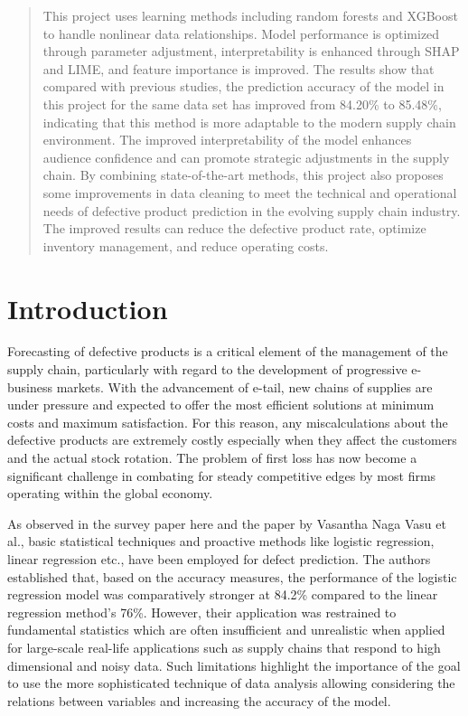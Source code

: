 \documentclass[conference]{IEEEtran}
\begin{document}
\maketitle

\begin{abstract}
This project uses learning methods including random forests and XGBoost to handle nonlinear data relationships. Model performance is optimized through parameter adjustment, interpretability is enhanced through SHAP and LIME, and feature importance is improved. The results show that compared with previous studies, the prediction accuracy of the model in this project for the same data set has improved from 84.20\% to 85.48\%, indicating that this method is more adaptable to the modern supply chain environment. The improved interpretability of the model enhances audience confidence and can promote strategic adjustments in the supply chain. By combining state-of-the-art methods, this project also proposes some improvements in data cleaning to meet the technical and operational needs of defective product prediction in the evolving supply chain industry. The improved results can reduce the defective product rate, optimize inventory management, and reduce operating costs.
\end{abstract}


\section{Introduction}

Forecasting of defective products is a critical element of the management of the supply chain, particularly with regard to the development of progressive e-business markets. With the advancement of e-tail, new chains of supplies are under pressure and expected to offer the most efficient solutions at minimum costs and maximum satisfaction. For this reason, any miscalculations about the defective products are extremely costly especially when they affect the customers and the actual stock rotation. The problem of first loss has now become a significant challenge in combating for steady competitive edges by most firms operating within the global economy.

As observed in the survey paper here and the paper by Vasantha Naga Vasu et al., basic statistical techniques and proactive methods like logistic regression, linear regression etc., have been employed for defect prediction. The authors established that, based on the accuracy measures, the performance of the logistic regression model was comparatively stronger at 84.2\% compared to the linear regression method’s 76\%. However, their application was restrained to fundamental statistics which are often insufficient and unrealistic when applied for large-scale real-life applications such as supply chains that respond to high dimensional and noisy data. Such limitations highlight the importance of the goal to use the more sophisticated technique of data analysis allowing considering the relations between variables and increasing the accuracy of the model.
\end{document}
